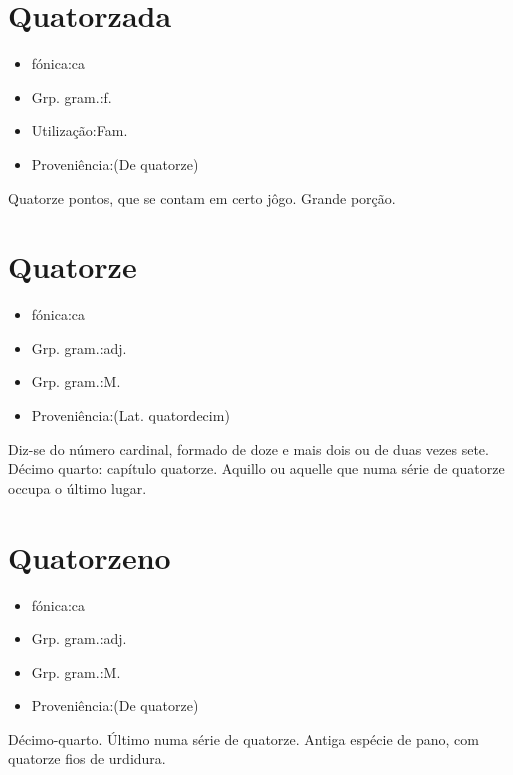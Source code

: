 \section{Quatorzada}
\begin{itemize}
\item {fónica:ca}
\end{itemize}
\begin{itemize}
\item {Grp. gram.:f.}
\end{itemize}
\begin{itemize}
\item {Utilização:Fam.}
\end{itemize}
\begin{itemize}
\item {Proveniência:(De \textunderscore quatorze\textunderscore )}
\end{itemize}
Quatorze pontos, que se contam em certo jôgo.
Grande porção.
\section{Quatorze}
\begin{itemize}
\item {fónica:ca}
\end{itemize}
\begin{itemize}
\item {Grp. gram.:adj.}
\end{itemize}
\begin{itemize}
\item {Grp. gram.:M.}
\end{itemize}
\begin{itemize}
\item {Proveniência:(Lat. \textunderscore quatordecim\textunderscore )}
\end{itemize}
Diz-se do número cardinal, formado de doze e mais dois ou de duas vezes sete.
Décimo quarto: \textunderscore capítulo quatorze\textunderscore .
Aquillo ou aquelle que numa série de quatorze occupa o último lugar.
\section{Quatorzeno}
\begin{itemize}
\item {fónica:ca}
\end{itemize}
\begin{itemize}
\item {Grp. gram.:adj.}
\end{itemize}
\begin{itemize}
\item {Grp. gram.:M.}
\end{itemize}
\begin{itemize}
\item {Proveniência:(De \textunderscore quatorze\textunderscore )}
\end{itemize}
Décimo-quarto.
Último numa série de quatorze.
Antiga espécie de pano, com quatorze fios de urdidura.
